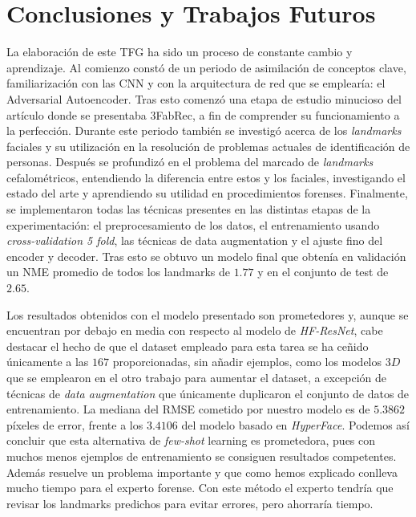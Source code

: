 \chapter{Conclusiones y Trabajos Futuros}

\noindent La elaboración de este TFG ha sido un proceso de constante cambio y aprendizaje. Al comienzo constó de un periodo de asimilación de conceptos clave, familiarización con las CNN y con la arquitectura de red que se emplearía: el Adversarial Autoencoder. Tras esto comenzó una etapa de estudio minucioso del artículo donde se presentaba 3FabRec, a fin de comprender su funcionamiento a la perfección. Durante este periodo también se investigó acerca de los \textit{landmarks} faciales y su utilización en la resolución de problemas actuales de identificación de personas. Después se profundizó en el problema del marcado de \textit{landmarks} cefalométricos, entendiendo la diferencia entre estos y los faciales, investigando el estado del arte y aprendiendo su utilidad en procedimientos forenses. Finalmente, se implementaron todas las técnicas presentes en las distintas etapas de la experimentación: el preprocesamiento de los datos, el entrenamiento usando \textit{cross-validation 5 fold}, las técnicas de data augmentation y el ajuste fino del encoder y decoder. Tras esto se obtuvo un modelo final que obtenía en validación un NME promedio de todos los landmarks de $1.77$ y en el conjunto de test de $2.65$.

\medskip

\noindent Los resultados obtenidos con el modelo presentado son prometedores y, aunque se encuentran por debajo en media con respecto al modelo de \textit{HF-ResNet}, cabe destacar el hecho de que el dataset empleado para esta tarea se ha ceñido únicamente a las $167$ proporcionadas, sin añadir ejemplos, como los modelos $3D$ que se emplearon en el otro trabajo para aumentar el dataset, a excepción de técnicas de \textit{data augmentation} que únicamente duplicaron el conjunto de datos de entrenamiento. La mediana del RMSE cometido por nuestro modelo es de $5.3862$ píxeles de error, frente a los $3.4106$ del modelo basado en \textit{HyperFace}. Podemos así concluir que esta alternativa de \textit{few-shot} learning es prometedora, pues con muchos menos ejemplos de entrenamiento se consiguen resultados competentes. Además resuelve un problema importante y que como hemos explicado conlleva mucho tiempo para el experto forense. Con este método el experto tendría que revisar los landmarks predichos para evitar errores, pero ahorraría tiempo.


